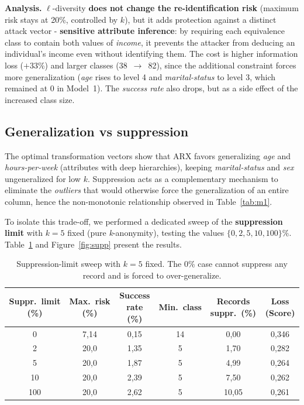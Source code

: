 \documentclass[10pt,a4paper]{article}
\begin{document}
\textbf{Analysis.} $\ell$-diversity \textbf{does not change the re-identification risk} (maximum risk stays at
20\%, controlled by $k$), but it adds protection against a distinct attack vector - \textbf{sensitive
attribute inference}: by requiring each equivalence class to contain both values of \textit{income}, it prevents
the attacker from deducing an individual's income even without identifying them. The cost is higher information
loss ($+$33\%) and larger classes (38~$\to$~82), since the additional constraint forces more generalization
(\textit{age} rises to level 4 and \textit{marital-status} to level 3, which remained at 0 in Model~1). The
\textit{success rate} also drops, but as a side effect of the increased class size.

\subsection{Generalization vs suppression}
The optimal transformation vectors show that ARX favors generalizing \textit{age} and \textit{hours-per-week}
(attributes with deep hierarchies), keeping \textit{marital-status} and \textit{sex} ungeneralized for low $k$.
Suppression acts as a complementary mechanism to eliminate the \textit{outliers} that would otherwise force the
generalization of an entire column, hence the non-monotonic relationship observed in Table~\ref{tab:m1}.

To isolate this trade-off, we performed a dedicated sweep of the \textbf{suppression limit} with $k=5$ fixed
(pure \textit{k}-anonymity), testing the values $\{0, 2, 5, 10, 100\}\%$. Table~\ref{tab:supp} and
Figure~\ref{fig:supp} present the results.

\begin{table}[h]
\centering\footnotesize
\begin{tabular}{c c c c c c}
\toprule
\textbf{Suppr.\ limit (\%)} & \textbf{Max.\ risk (\%)} & \textbf{Success rate (\%)} & \textbf{Min.\ class} & \textbf{Records suppr.\ (\%)} & \textbf{Loss (Score)} \\
\midrule
0   & 7{,}14 & 0{,}15 & 14 & 0{,}00  & 0{,}346 \\
2   & 20{,}0 & 1{,}35 & 5  & 1{,}70  & 0{,}282 \\
5   & 20{,}0 & 1{,}87 & 5  & 4{,}99  & 0{,}264 \\
10  & 20{,}0 & 2{,}39 & 5  & 7{,}50  & 0{,}262 \\
100 & 20{,}0 & 2{,}62 & 5  & 10{,}05 & 0{,}261 \\
\bottomrule
\end{tabular}
\caption{Suppression-limit sweep with $k=5$ fixed. The 0\% case cannot suppress any record and is forced to
over-generalize.}
\label{tab:supp}
\end{table}
\end{document}
